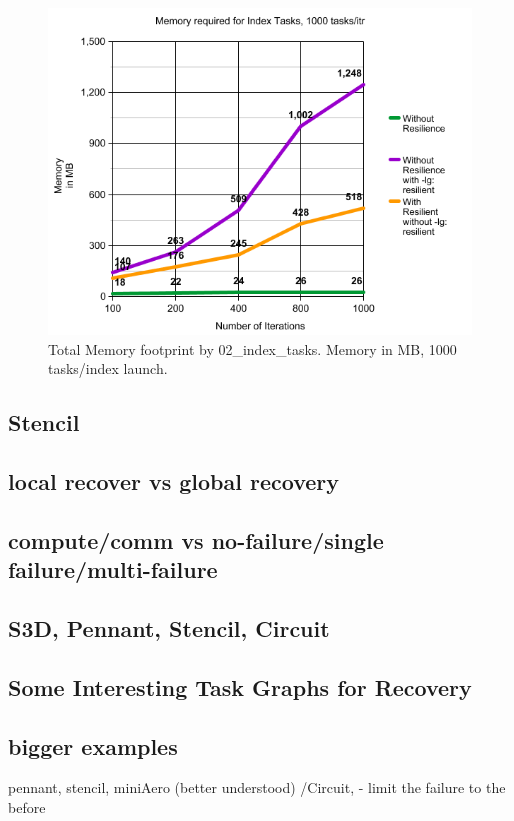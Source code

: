 \begin{figure}
\includegraphics[width=\textwidth]{images/index_tasks_memory.png}
\caption{Total Memory footprint by 02\_index\_tasks. Memory in MB, 1000 tasks/index launch.}
\end{figure}





\subsection{Stencil}



\subsection{local recover vs global recovery}

\subsection{compute/comm vs no-failure/single failure/multi-failure}

\subsection{S3D, Pennant, Stencil, Circuit}

\subsection{Some Interesting Task Graphs for Recovery}

\subsection{bigger examples}
pennant, stencil, miniAero (better understood) /Circuit, 
- limit the failure to the before


